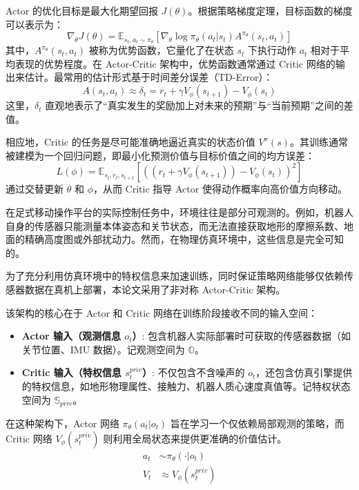 Actor 的优化目标是最大化期望回报 $J(\theta)$。根据策略梯度定理\cite{sutton:nips12}，目标函数的梯度可以表示为：
\begin{equation}
    \nabla_\theta J(\theta) = \mathbb{E}_{s_t, a_t \sim \pi_\theta} \left[ \nabla_\theta \log \pi_\theta(a_t | s_t) A^{\pi_\theta}(s_t, a_t) \right]
\end{equation}
其中，$A^{\pi_\theta}(s_t, a_t)$ 被称为优势函数，它量化了在状态 $s_t$ 下执行动作 $a_t$ 相对于平均表现的优势程度。在 Actor-Critic 架构中，优势函数通常通过 Critic 网络的输出来估计。最常用的估计形式基于时间差分误差（TD-Error）\cite{sutton1988learning}：
\begin{equation}
    A(s_t, a_t) \approx \delta_t = r_t + \gamma V_\phi(s_{t+1}) - V_\phi(s_t)
\end{equation}
这里，$\delta_t$ 直观地表示了“真实发生的奖励加上对未来的预期”与“当前预期”之间的差值。

相应地，Critic 的任务是尽可能准确地逼近真实的状态价值 $V^{\pi}(s)$。其训练通常被建模为一个回归问题，即最小化预测价值与目标价值之间的均方误差：
\begin{equation}
    L(\phi) = \mathbb{E}_{s_t, r_t, s_{t+1}} \left[ \left( (r_t + \gamma V_\phi(s_{t+1})) - V_\phi(s_t) \right)^2 \right]
\end{equation}
通过交替更新 $\theta$ 和 $\phi$，从而 Critic 指导 Actor 使得动作概率向高价值方向移动。

在足式移动操作平台的实际控制任务中，环境往往是部分可观测的。例如，机器人自身的传感器只能测量本体姿态和关节状态，而无法直接获取地形的摩擦系数、地面的精确高度图或外部扰动力。然而，在物理仿真环境中，这些信息是完全可知的。

为了充分利用仿真环境中的特权信息来加速训练，同时保证策略网络能够仅依赖传感器数据在真机上部署，本论文采用了非对称 Actor-Critic 架构。

该架构的核心在于 Actor 和 Critic 网络在训练阶段接收不同的输入空间：
\begin{itemize}
    \item \textbf{Actor 输入（观测信息 $o_t$）}: 包含机器人实际部署时可获取的传感器数据（如关节位置、IMU 数据）。记观测空间为 $\mathbb{O}$。
    \item \textbf{Critic 输入（特权信息 $s_t^{priv}$）}: 不仅包含不含噪声的 $o_t$，还包含仿真引擎提供的特权信息，如地形物理属性、接触力、机器人质心速度真值等。记特权状态空间为 $\mathbb{S}_{priv}$。
\end{itemize}

在这种架构下，Actor 网络 $\pi_\theta(a_t | o_t)$ 旨在学习一个仅依赖局部观测的策略，而 Critic 网络 $V_\phi(s_t^{priv})$ 则利用全局状态来提供更准确的价值估计。
\begin{equation}
    \begin{aligned}
        a_t & \sim \pi_\theta(\cdot | o_t) \\
        V_t & \approx V_\phi(s_t^{priv})
    \end{aligned}
\end{equation}

